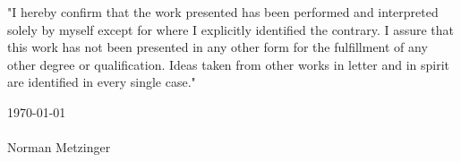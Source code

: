 "I hereby confirm that the work presented has been performed and
interpreted solely by myself except for where I explicitly identified the
contrary. I assure that this work has not been presented in any other
form for the fulfillment of any other degree or qualification. Ideas
taken from other works in letter and in spirit are identified in every
single case."

\today %
\\
\\
Norman Metzinger
